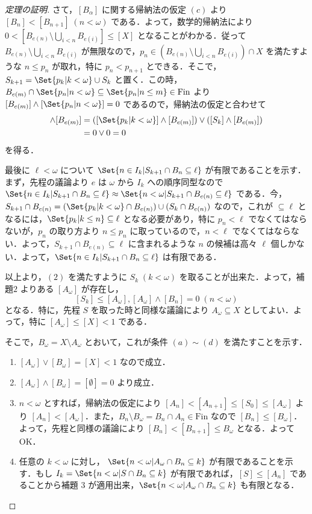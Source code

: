 \documentclass[a4j,lualatex,ja=standard]{bxjsarticle}
\begin{document}
\begin{proof}[定理の証明]
 さて，$[B_\alpha]$ に関する帰納法の仮定 $(c)$ より $[B_n] < [B_{n+1}] \; (n < \omega)$ である．よって，数学的帰納法により $0 < [B_{e(n)} \setminus \bigcup_{i < n} B_{e(i)}] \leq [X]$ となることがわかる．従って $B_{e(n)} \setminus \bigcup_{i < n} B_{e(i)}$ が無限なので，$p_n \in (B_{e(n)} \setminus \bigcup_{i<n} B_{e(i)}) \cap X$ を満たすような $n \leq p_n$ が取れ，特に $p_n < p_{n+1}$ とできる．そこで，$S_{k+1} = \Set{p_k | k < \omega} \cup S_k$ と置く．この時，$B_{e(m)} \cap \Set{ p_n | n < \omega} \subseteq \Set{ p_n | n \leq m } \in \mathrm{Fin}$ より $[B_{e(m)}] \wedge [\Set{ p_n | n < \omega}] = 0$ であるので，帰納法の仮定と合わせて
 \begin{align*}
  [S_{k+1}] \wedge [B_{e(m)}] &= ([\Set{p_k | k < \omega}] \wedge [B_{e(m)}]) \vee ([S_k] \wedge [B_{e(m)}])\\
  &= 0 \vee 0 = 0 
 \end{align*}
 を得る．

 最後に $\ell < \omega$ について $\Set{n \in I_k | S_{k+1} \cap B_n \subseteq \ell}$ が有限であることを示す．まず，先程の議論より $e$ は $\omega$ から $I_k$ への順序同型なので $\Set{ n \in I_k | S_{k+1} \cap B_n \subseteq \ell} \approx \Set{ n < \omega | S_{k+1} \cap B_{e(n)} \subseteq \ell}$ である．今，$S_{k+1} \cap B_{e(n)} = (\Set{p_k | k < \omega} \cap B_{e(n)}) \cup (S_k \cap B_{e(n)})$ なので，これが $\subseteq \ell$ となるには，$\Set{p_k | k \leq n} \subseteq \ell$ となる必要があり，特に $p_n < \ell$ でなくてはならないが，$p_n$ の取り方より $n \leq p_n$ に取っているので，$n < \ell$ でなくてはならない．よって，$S_{k+1} \cap B_{e(n)} \subseteq \ell$ に含まれるような $n$ の候補は高々 $\ell$ 個しかない．よって，$\Set{ n \in I_k | S_{k+1} \cap B_n \subseteq \ell}$ は有限である．

 以上より，$(2)$ を満たすように $S_k \; (k < \omega)$ を取ることが出来た．よって，補題$2$ よりある $[A_\omega]$ が存在し，
 \[
  [S_k] \leq [A_\omega], [A_\omega] \wedge [B_n] = 0 \; (n < \omega)
 \]
 となる．特に，先程 $S$ を取った時と同様な議論により $A_\omega \subseteq X$ としてよい．よって，特に $[A_\omega] \leq [X] < 1 $ である．

 そこで，$B_\omega = X \setminus A_\omega$ とおいて，これが条件 $(a) \sim (d)$ を満たすことを示す．

 \begin{enumerate}[label=(\alph*)]
  \item $[A_\omega] \vee [B_\omega] = [X] < 1$ なので成立．
  \item $[A_\omega] \wedge [B_\omega] = [\emptyset] = 0$ より成立．
  \item $n < \omega$ とすれば，帰納法の仮定により $[A_n] < [A_{n+1}] \leq [S_0] \leq [A_\omega]$ より $[A_n] < [A_\omega]$．また，$B_n \setminus B_\omega = B_n \cap A_n \in \mathrm{Fin}$ なので $[B_n] \leq [B_\omega]$．よって，先程と同様の議論により $[B_n] < [B_{n+1}] \leq B_\omega$ となる．よって OK．
  \item 任意の $k < \omega$ に対し， $\Set{n < \omega | A_\omega \cap B_n \subseteq k}$ が有限であることを示す．もし $I_k = \Set{ n < \omega | S \cap B_n \subseteq k}$ が有限であれば，$[S] \leq [A_n]$ であることから補題 $3$ が適用出来，$\Set{ n < \omega | A_\omega \cap B_n \subseteq k }$ も有限となる．


\end{enumerate}
\end{proof}
\end{document}
